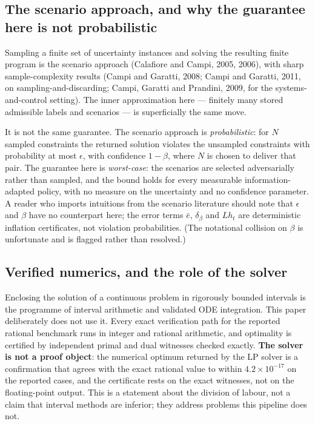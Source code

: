 \documentclass[10pt,twocolumn]{article}
\theoremstyle{plain}
\theoremstyle{definition}
\theoremstyle{remark}
\begin{document}
\subsection{The scenario approach, and why the guarantee here is not probabilistic}

Sampling a finite set of uncertainty instances and solving the resulting finite program is
the scenario approach (Calafiore and Campi, 2005, 2006), with sharp sample-complexity
results (Campi and Garatti, 2008; Campi and Garatti, 2011, on sampling-and-discarding; Campi,
Garatti and Prandini, 2009, for the systems-and-control setting). The inner approximation
here — finitely many stored admissible labels and scenarios — is superficially the same
move.

It is not the same guarantee. The scenario approach is \emph{probabilistic}: for $N$ sampled
constraints the returned solution violates the unsampled constraints with probability at most
$\epsilon$, with confidence $1-\beta$, where $N$ is chosen to deliver that pair. The
guarantee here is \emph{worst-case}: the scenarios are selected adversarially rather than
sampled, and the bound holds for every measurable information-adapted policy, with no
measure on the uncertainty and no confidence parameter. A reader who imports intuitions from
the scenario literature should note that $\epsilon$ and $\beta$ have no counterpart here;
the error terms $\bar{e}$, $\delta_{\beta}$ and $L h_t$ are deterministic inflation
certificates, not violation probabilities. (The notational collision on $\beta$ is
unfortunate and is flagged rather than resolved.)

\subsection{Verified numerics, and the role of the solver}

Enclosing the solution of a continuous problem in rigorously bounded intervals is the
programme of interval arithmetic and validated ODE integration. This paper deliberately does
not use it. Every exact verification path for the reported rational benchmark runs in integer
and rational arithmetic, and optimality is certified by independent primal and dual witnesses
checked exactly. \textbf{The solver is not a proof object}: the numerical optimum returned by
the LP solver is a confirmation that agrees with the exact rational value to within
$4.2\times10^{-17}$ on the reported cases, and the certificate rests on the exact witnesses,
not on the floating-point output. This is a statement about the division of labour, not a
claim that interval methods are inferior; they address problems this pipeline does not.
\end{document}

